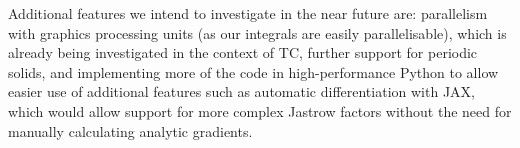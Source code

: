 Additional features we intend to investigate in the near future are: parallelism with graphics processing units (as our integrals are easily parallelisable), which is already being investigated in the context of TC, further support for periodic solids, and implementing more of the code in high-performance Python to allow easier use of additional features such as automatic differentiation\supercite{wengertSimple1964} with JAX,\supercite{jax2018github} which would allow support for more complex Jastrow factors without the need for manually calculating analytic gradients.

